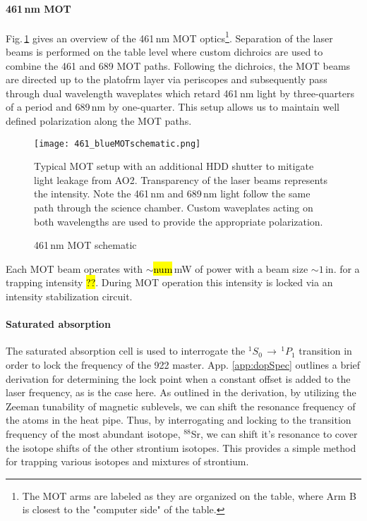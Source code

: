 \paragraph{461\,nm MOT}
Fig.\,\ref{fig:blueMOTSchematic} gives an overview of the 461\,nm MOT optics\footnote{The MOT arms are labeled as they are organized on the table, where Arm B is closest to the "computer side" of the table.}.
Separation of the laser beams is performed on the table level where custom dichroics are used to combine the 461 and 689 MOT paths.
Following the dichroics, the MOT beams are directed up to the platofrm layer via periscopes and subsequently pass through dual wavelength waveplates which retard 461\,nm light by three-quarters of a period and 689\,nm by one-quarter.
This setup allows us to maintain well defined polarization along the MOT paths.
	\begin{figure} 
		\centerline{
		\texttt{[image: 461\_blueMOTschematic.png]}}
		\caption{461\,nm MOT schematic}{Typical MOT setup with an additional HDD shutter to mitigate light leakage from AO2. Transparency of the laser beams represents the intensity. Note the 461\,nm and 689\,nm light follow the same path through the science chamber. Custom waveplates acting on both wavelengths are used to provide the appropriate polarization.}
		\label{fig:blueMOTSchematic}
	\end{figure}
Each MOT beam operates with $\sim$\hl{num}\,mW of power with a beam size $\sim 1$\,in. for a trapping intensity \hl{??}.
During MOT operation this intensity is locked via an intensity stabilization circuit.


\paragraph{Saturated absorption}
The saturated absorption cell is used to interrogate the $^1S_0\,\rightarrow\,^1P_1$ transition in order to lock the frequency of the 922 master.
App. \ref{app:dopSpec} outlines a brief derivation for determining the lock point when a constant offset is added to the laser frequency, as is the case here.
As outlined in the derivation, by utilizing the Zeeman tunability of magnetic sublevels, we can shift the resonance frequency of the atoms in the heat pipe.
Thus, by interrogating and locking to the transition frequency of the most abundant isotope, $^{88}$Sr, we can shift it's resonance to cover the isotope shifts of the other strontium isotopes.
This provides a simple method for trapping various isotopes and mixtures of strontium.

